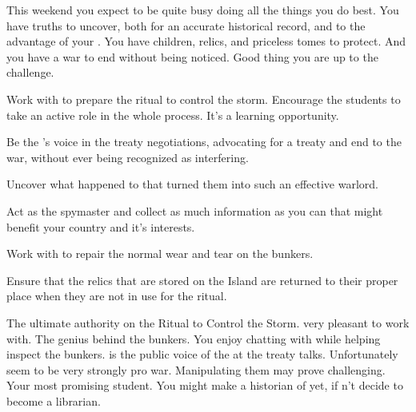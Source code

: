 \documentclass[char]{GL2020}
\begin{document}
This weekend you expect to be quite busy doing all the things you do best. You have truths to uncover, both for an accurate historical record, and to the advantage of your \cQueen{\Majesty}. You have children, relics, and priceless tomes to protect. And you have a war to end without being noticed. Good thing you are up to the challenge.

\begin{itemz}[Goals]
	\item Work with \cLibrarian{} to prepare the ritual to control the storm. Encourage the students to take an active role in the whole process. It’s a learning opportunity.
	\item Be the \cQueen{\Majesty}’s voice in the treaty negotiations, advocating for a treaty and end to the war, without ever being recognized as interfering.
	\item Uncover what happened to \cLoud{} that turned them into such an effective warlord.
	\item Act as the \pFarm{} spymaster and collect as much information as you can that might benefit your country and it’s interests.
	\item Work with \cBunker{} to repair the normal wear and tear on the bunkers.
	\item Ensure that the relics that are stored on the Island are returned to their proper place when they are not in use for the ritual.
\end{itemz}

\begin{itemz}[Notes]
	\item 
\end{itemz}

\begin{contacts}
	\contact{\cLibrarian{}} The ultimate authority on the Ritual to Control the Storm. \cLibrarian{\They} \cLibrarian{\are} very pleasant to work with.
	\contact{\cBunker{}} The genius behind the bunkers. You enjoy chatting with \cBunker{\them} while helping inspect the bunkers.
	\contact{\cEvil{}} \cEvil{} is the public voice of the \cQueen{\Majesty} at the treaty talks. Unfortunately \cEvil{\They} seem to be very strongly pro war. Manipulating them may prove challenging.
	\contact{\cLibAssist{}} Your most promising student. You might make a historian of \cLibAssist{\them} yet, if \cLibAssist{\they} \cLibAssist{\does}n’t decide to become a librarian.
\end{contacts}
\end{document}
